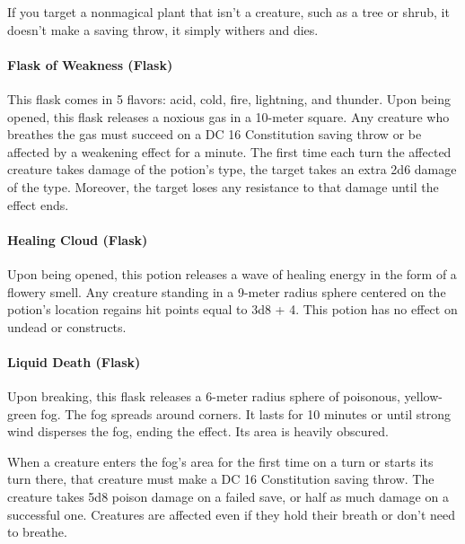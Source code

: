     If you target a nonmagical plant that isn't a creature, such as a tree or shrub, it doesn't make a saving throw, it simply withers and dies.
\paragraph{Flask of Weakness (Flask)} %
    This flask comes in 5 flavors: acid, cold, fire, lightning, and thunder.
    Upon being opened, this flask releases a noxious gas in a 10-meter square.
    Any creature who breathes the gas must succeed on a DC 16 Constitution saving throw or be affected by a weakening effect for a minute.
    The first time each turn the affected creature takes damage of the potion's type, the target takes an extra 2d6 damage of the type.
    Moreover, the target loses any resistance to that damage until the effect ends.
\paragraph{Healing Cloud (Flask)} %
    Upon being opened, this potion releases a wave of healing energy in the form of a flowery smell.
    Any creature standing in a 9-meter radius sphere centered on the potion's location regains hit points equal to 3d8 + 4.
    This potion has no effect on undead or constructs.
\paragraph{Liquid Death (Flask)} %
    Upon breaking, this flask releases a 6-meter radius sphere of poisonous, yellow-green fog.
    The fog spreads around corners.
    It lasts for 10 minutes or until strong wind disperses the fog, ending the effect.
    Its area is heavily obscured.

    When a creature enters the fog's area for the first time on a turn or starts its turn there, that creature must make a DC 16 Constitution saving throw.
    The creature takes 5d8 poison damage on a failed save, or half as much damage on a successful one.
    Creatures are affected even if they hold their breath or don't need to breathe.

